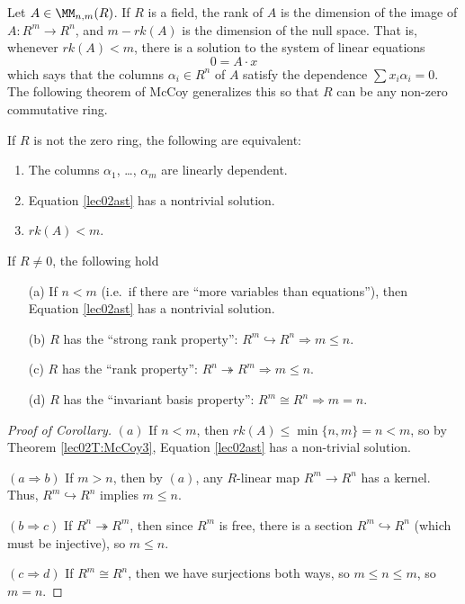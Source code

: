  Let $A\in \MM_{n,m}(R)$. If $R$ is a field, the rank of $A$ is the dimension of the
 image of $A:R^m\to R^n$, and $m-rk(A)$ is the dimension of the null space. That
 is, whenever $rk(A)< m$, there is a solution to the system of linear equations
 \begin{equation}
 0 = A\cdot x \label{lec02ast}
 \end{equation}
 which says that the columns $\alpha_i\in R^n$ of $A$ satisfy the dependence $\sum
 x_i\alpha_i=0$. The following theorem of McCoy generalizes this so that $R$ can be any
 non-zero commutative ring.
 \begin{theorem}[McCoy]\label{lec02T:McCoy3}
   If $R$ is not the zero ring, the following are equivalent:
   \begin{enumerate}
     \item The columns $\alpha_1$, \dots, $\alpha_m$ are linearly dependent.
     \item Equation \ref{lec02ast} has a nontrivial solution.
     \item $rk(A)<m$.
   \end{enumerate}
 \end{theorem}
 \begin{corollary}
   If $R\ne 0$, the following hold
   \begin{enumerate}
     \item[(a)] If $n<m$ (i.e.\ if there are ``more variables than equations''), then
      Equation \ref{lec02ast} has a nontrivial solution.
     \item[(b)] $R$ has the ``strong rank property'':
        $R^m\hookrightarrow R^n \Longrightarrow m\le n$.
     \item[(c)] $R$ has the ``rank property'':
        $R^n\twoheadrightarrow R^m \Longrightarrow m\le n$.
     \item[(d)] $R$ has the ``invariant basis property'':
        $R^m\cong R^n \Longrightarrow m=n$.
   \end{enumerate}
 \end{corollary}
 \begin{proof}[Proof of Corollary]
   $(a)$ If $n<m$, then $rk(A)\le \min\{n,m\} =n< m$, so by Theorem \ref{lec02T:McCoy3},
   Equation \ref{lec02ast} has a non-trivial solution.

   $(a\Rightarrow b)$ If $m>n$, then by $(a)$, any $R$-linear map $R^m\to R^n$
   has a kernel. Thus, $R^m\hookrightarrow R^n$ implies $m\le n$.

   $(b\Rightarrow c)$ If $R^n\twoheadrightarrow R^m$, then since $R^m$ is free,
   there is a section $R^m\hookrightarrow R^n$ (which must be injective), so $m\le n$.

   $(c\Rightarrow d)$ If $R^m\cong R^n$, then we have surjections both ways, so
   $m\le n\le m$, so $m=n$.
 \end{proof}
